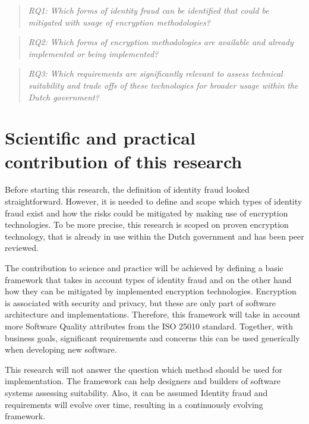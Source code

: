 \begin{quote}\emph{RQ1: Which forms of identity fraud can be identified that could be mitigated with usage of encryption methodologies?}\end{quote}
\begin{quote}\emph{RQ2: Which forms of encryption methodologies are available and already implemented or being implemented?}\end{quote}
\begin{quote}\emph{RQ3: Which requirements are significantly relevant to assess technical suitability and trade offs of these technologies for broader usage within the Dutch government?}\end{quote}

\section{Scientific and practical contribution of this research}
Before starting this research, the definition of identity fraud looked straightforward. However, it is needed to define and scope which types of identity fraud exist and how the risks could be mitigated by making use of encryption technologies. To be more precise, this research is scoped on proven encryption technology, that is already in use within the Dutch government and has been peer reviewed. 

The contribution to science and practice will be achieved by defining a basic framework that takes in account types of identity fraud and on the other hand how they can be mitigated by implemented encryption technologies. Encryption is associated with security and privacy, but these are only part of software architecture and implementations. Therefore, this framework will take in account more Software Quality attributes from the ISO 25010 standard. Together, with business goals, significant requirements and concerns this can be used generically when developing new software. 

This research will not answer the question which method should be used for implementation. The framework can help designers and builders of software systems assessing suitability. Also, it can be assumed Identity fraud and requirements will evolve over time, resulting in a continuously evolving framework.
